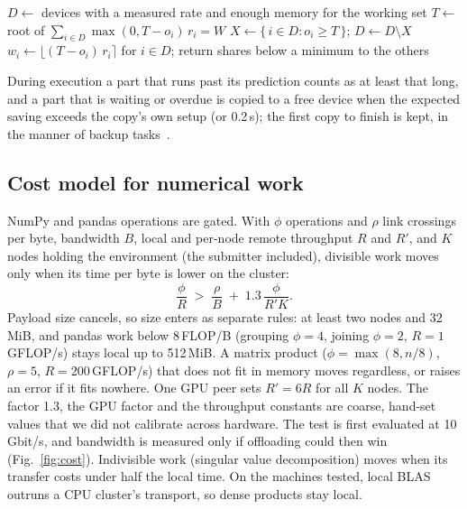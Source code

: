 \documentclass[5p,times,twocolumn]{elsarticle}
\begin{document}
\begin{algorithm}[t]
\caption{Dividing $W$ items among devices}
\label{alg:split}
\begin{algorithmic}[1]
\State $D \gets$ devices with a measured rate and enough memory for the working set
\Repeat
  \State $T \gets$ root of $\sum_{i\in D}\max(0,T-o_i)\,r_i = W$
  \State $X \gets \{\, i \in D : o_i \ge T \,\}$; \quad $D \gets D \setminus X$
\State $w_i \gets \lfloor (T-o_i)\,r_i \rceil$ for $i\in D$; return shares below a minimum to the others
\end{algorithmic}
\end{algorithm}

During execution a part that runs past its prediction counts as at least that
long, and a part that is waiting or overdue is copied to a free device when the
expected saving exceeds the copy's own setup (or 0.2\,s); the first copy to
finish is kept, in the manner of backup tasks~\cite{dean2004mapreduce,zaharia2008late}.

\subsection{Cost model for numerical work}
\label{sec:cost}

NumPy and pandas operations are gated. With $\phi$ operations and $\rho$ link
crossings per byte, bandwidth $B$, local and per-node remote throughput $R$ and
$R'$, and $K$ nodes holding the environment (the submitter included), divisible
work moves only when its time per byte is lower on the cluster:
\begin{equation}
\label{eq:cost}
\frac{\phi}{R} \;>\; \frac{\rho}{B} \;+\; 1.3\,\frac{\phi}{R'K} .
\end{equation}
Payload size cancels, so size enters as separate rules: at least two nodes and
32\,MiB, and pandas work below 8\,FLOP/B (grouping $\phi=4$, joining $\phi=2$,
$R=1$\,GFLOP/s) stays local up to 512\,MiB. A matrix product
($\phi=\max(8,n/8)$, $\rho=5$, $R=200$\,GFLOP/s) that does not fit in memory
moves regardless, or raises an error if it fits nowhere. One GPU peer sets
$R'=6R$ for all $K$ nodes. The factor 1.3, the GPU factor and the throughput
constants are coarse, hand-set values that we did not calibrate across
hardware. The test is first evaluated at 10\,Gbit/s, and bandwidth is measured
only if offloading could then win (Fig.~\ref{fig:cost}). Indivisible work
(singular value decomposition) moves when its transfer costs under half the
local time. On the machines tested, local BLAS outruns a CPU cluster's
transport, so dense products stay local.
\end{document}
